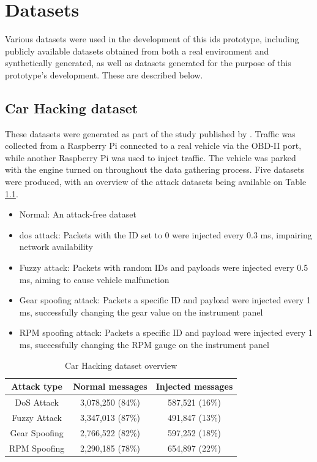 \chapter{Datasets}
\label{c:datasets}

Various datasets were used in the development of this \gls{ids} prototype, including publicly available datasets obtained from both a real environment and synthetically generated, as well as datasets generated for the purpose of this prototype's development. These are described below.

\section{Car Hacking dataset}

These datasets were generated as part of the study published by \cite{Song2020}. Traffic was collected from a Raspberry Pi connected to a real vehicle via the OBD-II port, while another Raspberry Pi was used to inject traffic. The vehicle was parked with the engine turned on throughout the data gathering process. Five datasets were produced, with an overview of the attack datasets being available on Table \ref{tab:car_hacking_dataset_overview}.

\begin{itemize}
    \item Normal: An attack-free dataset
    \item \gls{dos} attack: Packets with the ID set to 0 were injected every 0.3 ms, impairing network availability
    \item Fuzzy attack: Packets with random IDs and payloads were injected every 0.5 ms, aiming to cause vehicle malfunction
    \item Gear spoofing attack: Packets a specific ID and payload were injected every 1 ms, successfully changing the gear value on the instrument panel
    \item RPM spoofing attack: Packets a specific ID and payload were injected every 1 ms, successfully changing the RPM gauge on the instrument panel
\end{itemize}

\begin{table}
    \centering
    \begin{tabular}{*{3}{c}}
        \toprule
        \textbf{Attack type} & \textbf{Normal messages} & \textbf{Injected messages}\\
        \midrule
        DoS Attack & 3,078,250 (84\%) & 587,521 (16\%)\\
        Fuzzy Attack & 3,347,013 (87\%) & 491,847 (13\%)\\
        Gear Spoofing & 2,766,522 (82\%) & 597,252 (18\%)\\
        RPM Spoofing & 2,290,185 (78\%) & 654,897 (22\%)\\
        \bottomrule
    \end{tabular}
    \caption{Car Hacking dataset overview}
    \label{tab:car_hacking_dataset_overview}
\end{table}

